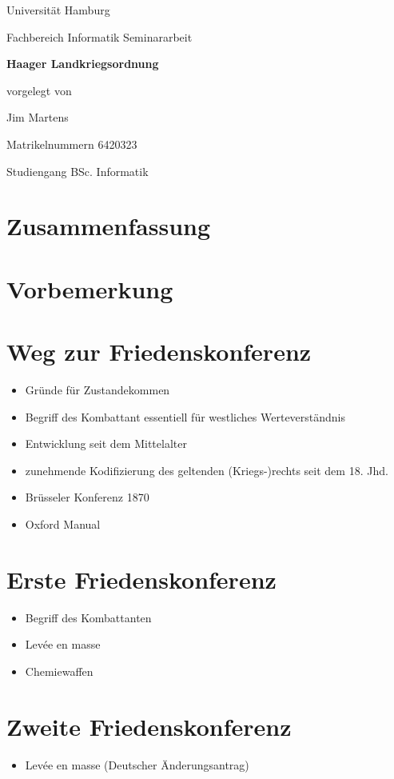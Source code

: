 \documentclass[12pt]{scrartcl}
\begin{document}
\newpage
\thispagestyle{empty}
\begin{center}\Large
Universität Hamburg \par
Fachbereich Informatik
\vfill
Seminararbeit
\vfill
{\Large\textsf{\textbf{Haager Landkriegsordnung}}\par}
\vfill
vorgelegt von 
\par\bigskip
Jim Martens \par
Matrikelnummern 6420323 \par
Studiengang BSc. Informatik
\end{center}

\newpage
\section*{Zusammenfassung}

\newpage
\tableofcontents

\newpage
\section{Vorbemerkung}


\section{Weg zur Friedenskonferenz}
\begin{itemize}
	\item Gründe für Zustandekommen\cite{Buss1992}
	\item Begriff des Kombattant essentiell für westliches Werteverständnis
	\item Entwicklung seit dem Mittelalter
	\item zunehmende Kodifizierung des geltenden (Kriegs-)rechts seit dem 18. Jhd.
	\item Brüsseler Konferenz 1870
	\item Oxford Manual
\end{itemize}
\section{Erste Friedenskonferenz}
\begin{itemize}
	\item Begriff des Kombattanten\cite{Buss1992}
	\item Levée en masse\cite{Scott1920}
	\item Chemiewaffen\cite{Scott1920}
\end{itemize}
\section{Zweite Friedenskonferenz}
\begin{itemize}
	\item Levée en masse (Deutscher Änderungsantrag)
\end{itemize}
\end{document}
